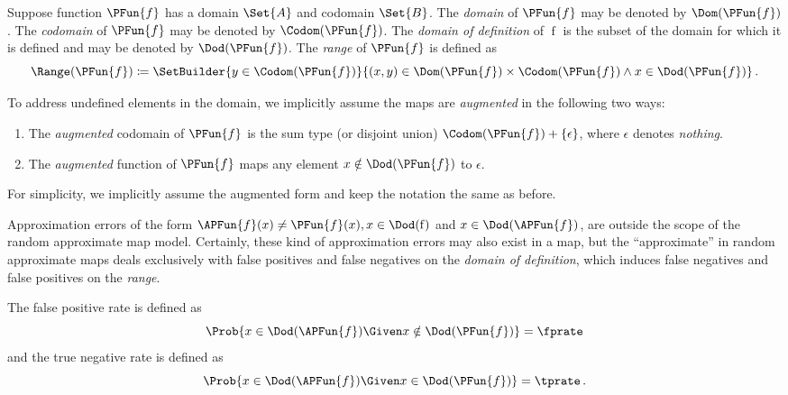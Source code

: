 \documentclass[ ../main.tex]{subfiles}
\begin{document}
Suppose function $\PFun{f}$ has a domain $\Set{A}$ and codomain $\Set{B}$.
The \emph{domain} of $\PFun{f}$ may be denoted by $\Dom(\PFun{f})$.
The \emph{codomain} of $\PFun{f}$ may be denoted by $\Codom(\PFun{f})$.
The \emph{domain of definition} of $\operatorname{f}$ is the subset of the domain for which it is defined and may be denoted by $\Dod(\PFun{f})$.
The \emph{range} of $\PFun{f}$ is defined as
\begin{equation}
\Range(\PFun{f}) \coloneqq
\SetBuilder{y \in \Codom(\PFun{f})}{(x,y) \in \Dom(\PFun{f}) \times \Codom(\PFun{f}) \land x \in \Dod(\PFun{f})}\,.
\end{equation}

To address undefined elements in the domain, we implicitly assume the maps are \emph{augmented} in the following two ways:
\begin{enumerate}
	\item The \emph{augmented} codomain of $\PFun{f}$ is the sum type (or disjoint union) $\Codom(\PFun{f}) + \{\epsilon\}$, where $\epsilon$ denotes \emph{nothing}.
	\item The \emph{augmented} function of $\PFun{f}$ maps any element $x \notin \Dod(\PFun{f})$ to $\epsilon$.
\end{enumerate}
For simplicity, we implicitly assume the augmented form and keep the notation the same as before.


\begin{remark}
	Approximation errors of the form $\APFun{f}(x) \neq \PFun{f}(x),x\in \Dod(\operatorname{f})$ and $x \in \Dod(\APFun{f})$, are outside the scope of the random approximate map model.
	Certainly, these kind of approximation errors may also exist in a map, but the ``approximate'' in random approximate maps deals exclusively with false positives and false negatives on the \emph{domain of definition}, which induces false negatives and false positives on the \emph{range}.
\end{remark}

The false positive rate is defined as
\begin{equation}
\Prob{x \in \Dod(\APFun{f}) \Given x \notin \Dod(\PFun{f})} = \fprate
\end{equation}
and the true negative rate is defined as
\begin{equation}
\Prob{x \in \Dod(\APFun{f}) \Given x \in \Dod(\PFun{f})} = \tprate\,.
\end{equation}
\end{document}

